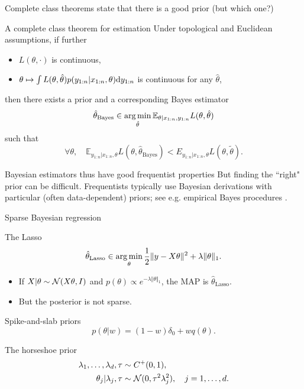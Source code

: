 \documentclass[10pt]{beamer}
\begin{document}
\begin{frame}{Complete class theorems state that there is a good prior (but which one?)}

\begin{block}{A complete class theorem for estimation \citep{Ber85}}
Under topological and Euclidean assumptions, if further \begin{itemize}
\item $L(\theta,\cdot)$ is continuous,
\item $\theta\mapsto \int L(\theta,\hat\theta)p(y_{1:n} \vert x_{1:n}, \theta){\rm d} y_{1:n}$ is continuous for any $\hat\theta$,
\end{itemize}
then  there exists a prior and a corresponding Bayes estimator
$$
\hat\theta_{\text{Bayes}} \in \operatorname*{arg\,min}_{\hat\theta} \mathbb{E}_{\theta\vert x_{1:n},y_{1:n}} L(\theta,\hat\theta)
$$
such that
$$ \forall \theta, \quad \mathbb E_{y_{1:n}\vert x_{1:n},\theta} L(\theta,\hat\theta_{\text{Bayes}}) < E_{y_{1:n}\vert x_{1:n},\theta} L(\theta,\tilde\theta).$$
\end{block}
\begin{alertblock}{Bayesian estimators thus have good frequentist properties}
But finding the ``right" prior can be difficult. Frequentists typically use Bayesian derivations with particular (often data-dependent) priors; see e.g. empirical Bayes procedures \citep{Efr10}.
\end{alertblock}
\end{frame}

\begin{frame}{Sparse Bayesian regression}
\begin{block}{The Lasso}
$$ 
\hat\theta_{\text{Lasso}} \in \operatorname*{arg\,min}_\theta \frac12 \Vert y -X\theta\Vert^2 + \lambda \Vert \theta\Vert_1.
$$
\end{block}
\begin{itemize}
\item If $X\vert\theta \sim \mathcal{N}(X\theta, I)$ and $p(\theta) \propto e^{-\lambda\Vert \theta\Vert_1}$, the MAP is $\hat\theta_{\text{Lasso}}$.
\item But the posterior is not sparse.
\end{itemize}
\begin{block}{Spike-and-slab priors}
  \vspace{-5pt}
  $$
    p(\theta\vert w) = (1-w)\delta_0 + w q(\theta).
  $$
\end{block}

\begin{block}{The horseshoe prior \citep{CaPoSc10}}
  \vspace{-15pt}
  \begin{align*}
    \lambda_1, \dots, \lambda_d, \tau & \sim C^+(0,1), \\
    \theta_j\vert \lambda_j, \tau &\sim \mathcal{N}(0, \tau^2 \lambda_j^2), \quad j=1,\dots, d.
  \end{align*}
\end{block}
\end{frame}
\end{document}
